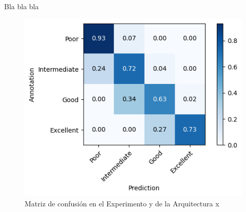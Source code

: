 \documentclass{article}
\begin{document}
			Bla bla bla
			\begin{figure}[!h]
				\begin{center}
					\includegraphics[scale=0.7]{n-cm-ax-ey.png}		
					\caption{Matriz de confusi\'on en el Experimento y de la Arquitectura x}	
					\label{n-cm-a4-e3}
				\end{center}
			\end{figure}
\end{document}
